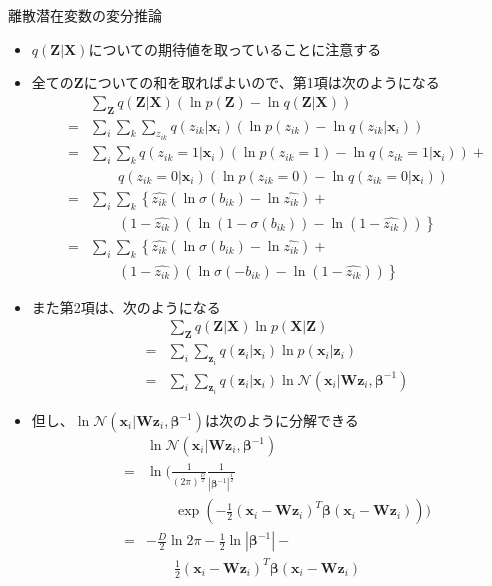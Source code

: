 \documentclass[dvipdfmx,notheorems,t]{beamer}
\begin{document}
\begin{frame}{離散潜在変数の変分推論}
\begin{itemize}
\begin{itemize}
		\item $q(\bm{Z} | \bm{X})$についての期待値を取っていることに注意する
		\item 全ての$\bm{Z}$についての和を取ればよいので、第1項は次のようになる
		\begin{eqnarray}
			&& \sum_{\bm{Z}} q(\bm{Z} | \bm{X}) \left( \ln p(\bm{Z}) - \ln q(\bm{Z} | \bm{X}) \right) \nonumber \\
			&=& \sum_i \sum_k \sum_{z_{ik}} q(z_{ik} | \bm{x}_i) \left( \ln p(z_{ik}) - \ln q(z_{ik} | \bm{x}_i) \right) \\
			&=& \sum_i \sum_k q(z_{ik} = 1 | \bm{x}_i) \left( \ln p(z_{ik} = 1) - \ln q(z_{ik} = 1 | \bm{x}_i) \right) + \nonumber \\
			&& \qquad q(z_{ik} = 0 | \bm{x}_i) \left( \ln p(z_{ik} = 0) - \ln q(z_{ik} = 0 | \bm{x}_i) \right) \\
			&=& \sum_i \sum_k \left\{ \widehat{z_{ik}} \left( \ln \sigma(b_{ik}) - \ln \widehat{z_{ik}} \right) + \right. \nonumber \\
			&& \qquad \left. \left( 1 - \widehat{z_{ik}} \right) \left( \ln \left( 1 - \sigma(b_{ik}) \right) - \ln \left( 1 - \widehat{z_{ik}} \right) \right) \right\} \\
			&=& \sum_i \sum_k \left\{ \widehat{z_{ik}} \left( \ln \sigma(b_{ik}) - \ln \widehat{z_{ik}} \right) + \right. \nonumber \\
			&& \qquad \left. \left( 1 - \widehat{z_{ik}} \right) \left( \ln \sigma(-b_{ik}) - \ln \left( 1 - \widehat{z_{ik}} \right) \right) \right\}
		\end{eqnarray}
		
		\item また第2項は、次のようになる
		\begin{eqnarray}
			&& \sum_{\bm{Z}} q(\bm{Z} | \bm{X}) \ln p(\bm{X} | \bm{Z}) \nonumber \\
			&=& \sum_i \sum_{\bm{z}_i} q(\bm{z}_i | \bm{x}_i) \ln p(\bm{x}_i | \bm{z}_i) \\
			&=& \sum_i \sum_{\bm{z}_i} q(\bm{z}_i | \bm{x}_i) \ln \mathcal{N}(\bm{x}_i | \bm{W} \bm{z}_i, \bm{\beta}^{-1})
		\end{eqnarray}
		
		\item 但し、$\ln \mathcal{N}(\bm{x}_i | \bm{W} \bm{z}_i, \bm{\beta}^{-1})$は次のように分解できる
		\begin{eqnarray}
			&& \ln \mathcal{N}(\bm{x}_i | \bm{W} \bm{z}_i, \bm{\beta}^{-1}) \nonumber \\
			&=& \ln \Bigg( \frac{1}{(2\pi)^\frac{D}{2}} \frac{1}{|\bm{\beta}^{-1}|^\frac{1}{2}} \nonumber \\
			&& \qquad \exp \left( -\frac{1}{2} \left( \bm{x}_i - \bm{W} \bm{z}_i \right)^T \bm{\beta} \left( \bm{x}_i - \bm{W} \bm{z}_i \right) \right) \Bigg) \\
			&=& -\frac{D}{2} \ln 2\pi - \frac{1}{2} \ln |\bm{\beta}^{-1}| - \nonumber \\
			&& \qquad \frac{1}{2} \left( \bm{x}_i - \bm{W} \bm{z}_i \right)^T \bm{\beta} \left( \bm{x}_i - \bm{W} \bm{z}_i \right)
		\end{eqnarray}
		

\end{itemize}
\end{itemize}
\end{frame}
\end{document}
